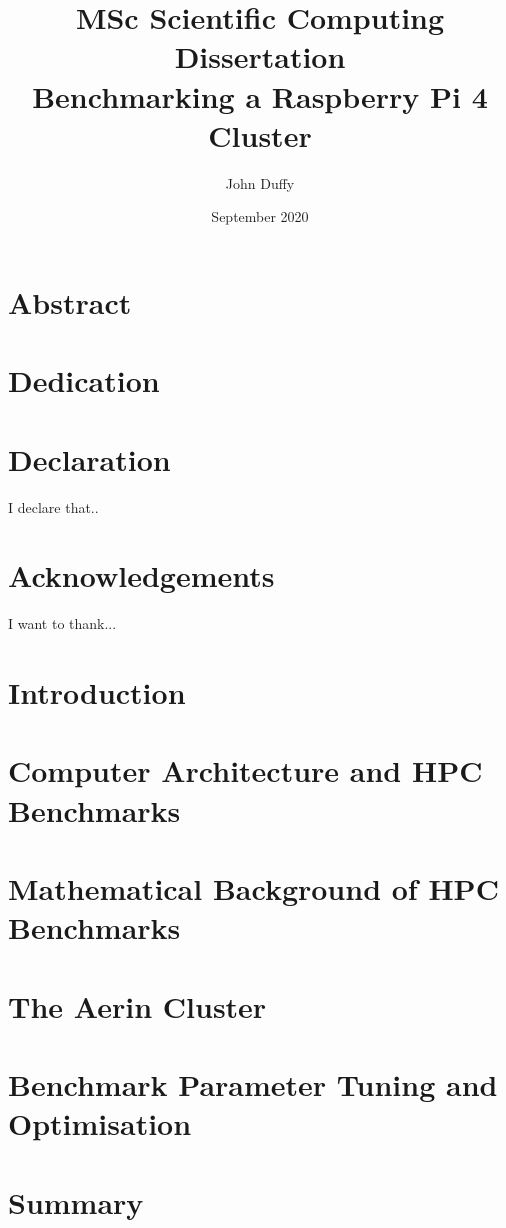 \documentclass{report}
\title{MSc Scientific Computing Dissertation\\Benchmarking a Raspberry Pi 4 Cluster}
\author{John Duffy}
\date{September 2020}
\begin{document}
%
%
\maketitle
%


%
%
\chapter*{Abstract}
%


%
%
\chapter*{Dedication}


%
% 
\chapter*{Declaration}
I declare that..


%
%
\chapter*{Acknowledgements}
I want to thank...


%
%
\tableofcontents


%
%
\chapter{Introduction}



%
%
\chapter{Computer Architecture and HPC Benchmarks}



%
%
\chapter{Mathematical Background of HPC Benchmarks}



%
%
\chapter{The Aerin Cluster}



%
%
\chapter{Benchmark Parameter Tuning and Optimisation}



%
%
\chapter{Summary}



%
%
\printbibliography[heading=bibintoc, title={References}]
\end{document}
